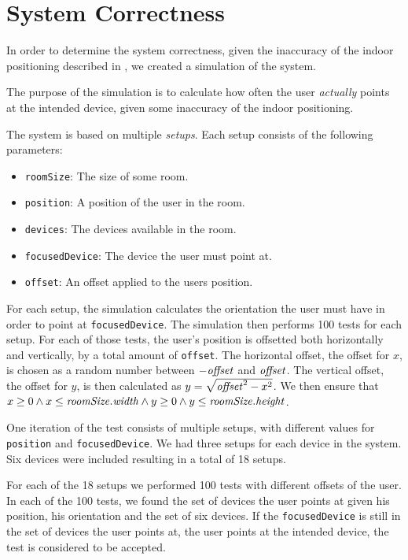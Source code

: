 \section{System Correctness}
\label{sec:evaluation:system-correctness}

In order to determine the system correctness, 
given the inaccuracy of the indoor positioning described in , 
we created a simulation of the system.

The purpose of the simulation is to calculate how often the user \emph{actually} points at the intended device, 
given some inaccuracy of the indoor positioning.

The system is based on multiple \textit{setups}. 
Each setup consists of the following parameters:
\begin{itemize}
\item \texttt{roomSize}: The size of some room.
\item \texttt{position}: A position of the user in the room.
\item \texttt{devices}: The devices available in the room.
\item \texttt{focusedDevice}: The device the user must point at.
\item \texttt{offset}: An offset applied to the users position.
\end{itemize}

For each setup, the simulation calculates the orientation the user must have in order to point at \texttt{focusedDevice}. 
The simulation then performs \num{100} tests for each setup. 
For each of those tests, 
the user's position is offsetted both horizontally and vertically, 
by a total amount of \texttt{offset}. 
The horizontal offset, \ie the offset for $x$, 
is chosen as a random number between $-\var{offset}$ and $\var{offset}$. 
The vertical offset, \ie the offset for $y$, 
is then calculated as $y = \sqrt{\var{offset}^2 - x^2}$. 
We then ensure that $x \geq 0 \wedge x \leq \var{roomSize.width} \wedge y \geq 0 \wedge y \leq \var{roomSize.height}$.

One iteration of the test consists of multiple setups, 
with different values for \texttt{position} and \texttt{focusedDevice}. 
We had three setups for each device in the system. 
Six devices were included resulting in a total of 18 setups.

For each of the \num{18} setups we performed \num{100} tests with different offsets of the user. 
In each of the \num{100} tests, 
we found the set of devices the user points at given his position, 
his orientation and the set of six devices. 
If the \texttt{focusedDevice} is still in the set of devices the user points at, 
\ie the user points at the intended device,
the test is considered to be accepted. 

